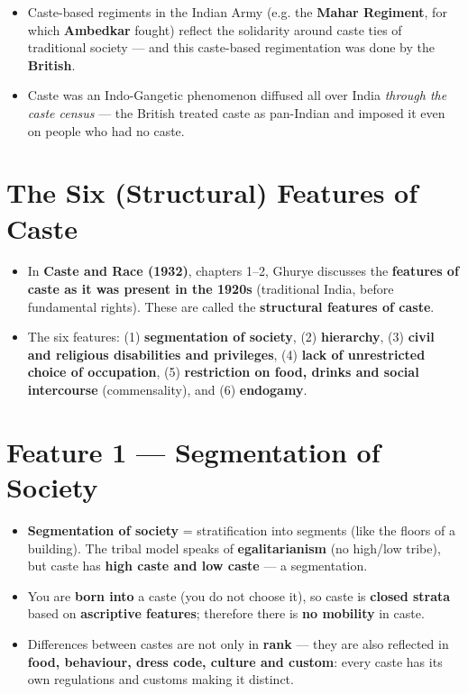 \begin{ExampleBox}
\begin{itemize}
\item Caste-based regiments in the Indian Army (e.g. the \textbf{Mahar Regiment}, for which \textbf{Ambedkar} fought) reflect the solidarity around caste ties of traditional society --- and this caste-based regimentation was done by the \textbf{British}.
\item Caste was an Indo-Gangetic phenomenon diffused all over India \emph{through the caste census} --- the British treated caste as pan-Indian and imposed it even on people who had no caste.
\end{itemize}
\end{ExampleBox}

\section{The Six (Structural) Features of Caste}

\begin{KeyConcept}
\begin{itemize}
\item In \textbf{Caste and Race (1932)}, chapters 1--2, Ghurye discusses the \textbf{features of caste as it was present in the 1920s} (traditional India, before fundamental rights). These are called the \textbf{structural features of caste}.
\item The six features: (1) \textbf{segmentation of society}, (2) \textbf{hierarchy}, (3) \textbf{civil and religious disabilities and privileges}, (4) \textbf{lack of unrestricted choice of occupation}, (5) \textbf{restriction on food, drinks and social intercourse} (commensality), and (6) \textbf{endogamy}.
\end{itemize}
\end{KeyConcept}

\section{Feature 1 --- Segmentation of Society}

\begin{KeyConcept}
\begin{itemize}
\item \textbf{Segmentation of society} = stratification into segments (like the floors of a building). The tribal model speaks of \textbf{egalitarianism} (no high/low tribe), but caste has \textbf{high caste and low caste} --- a segmentation.
\item You are \textbf{born into} a caste (you do not choose it), so caste is \textbf{closed strata} based on \textbf{ascriptive features}; therefore there is \textbf{no mobility} in caste.
\item Differences between castes are not only in \textbf{rank} --- they are also reflected in \textbf{food, behaviour, dress code, culture and custom}: every caste has its own regulations and customs making it distinct.
\end{itemize}
\end{KeyConcept}

